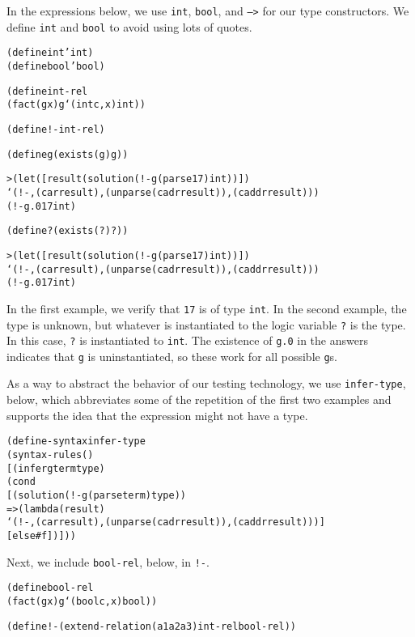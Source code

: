 In the expressions below, we use \texttt{int}, \texttt{bool}, and
\texttt{-->} for our type constructors.  We define \texttt{int}
and \texttt{bool} to avoid using lots of quotes.

\begin{alltt}
(define int 'int)
(define bool 'bool)
\end{alltt}

\begin{alltt}
(define int-rel
  (fact (g x) g `(intc ,x) int))

(define !- int-rel)
\end{alltt}

\begin{alltt}
(define g (exists (g) g))

> (let ([result (solution (!- g (parse 17) int))])
    `(!- ,(car result) ,(unparse (cadr result)) ,(caddr result)))
(!- g.0 17 int)

(define ? (exists (?) ?))

> (let ([result (solution (!- g (parse 17) int))])
    `(!- ,(car result) ,(unparse (cadr result)) ,(caddr result)))
(!- g.0 17 int)
\end{alltt}

In the first example, we verify that \texttt{17} is of type
\texttt{int}.  In the second example, the type is unknown, but
whatever is instantiated to the logic variable \texttt{?} is the
type.  In this case, \texttt{?} is instantiated to \texttt{int}.
The existence of \texttt{g.0} in the answers indicates that \texttt{g}
is uninstantiated, so these work for all possible \texttt{g}s.

As a way to abstract the behavior of our testing technology, we
use \texttt{infer-type}, below, which abbreviates some of the
repetition of the first two examples and supports the idea that
the expression might not have a type.

\begin{alltt}
(define-syntax infer-type
  (syntax-rules ()
    [(infer g term type)
     (cond
       [(solution (!- g (parse term) type))
        => (lambda (result)
             `(!- ,(car result) ,(unparse (cadr result)) ,(caddr result)))]
       [else #f])]))
\end{alltt}

Next, we include \texttt{bool-rel}, below, in \texttt{!-}.
\begin{alltt}
(define bool-rel
  (fact (g x) g `(boolc ,x) bool))

(define !- (extend-relation (a1 a2 a3) int-rel bool-rel))
\end{alltt}

